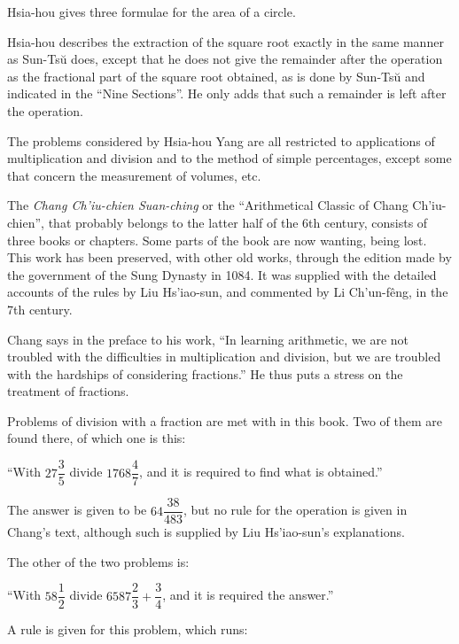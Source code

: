 \documentclass[11pt]{article}
\newcommand{\scanpage}[2]{\clearpage\setcounter{footnote}{0}\noindent{\footnotesize\color{gray}PDF page #1 · #2}\par\medskip}
\newcommand{\scanfooter}{}
\begin{document}
Hsia-hou gives three formulae for the area of a circle.

Hsia-hou describes the extraction of the square root exactly in the same manner as Sun-Tsŭ does, except that he does not give the remainder after the operation as the fractional part of the square root obtained, as is done by Sun-Tsŭ and indicated in the ``Nine Sections''. He only adds that such a remainder is left after the operation.

The problems considered by Hsia-hou Yang are all restricted to applications of multiplication and division and to the method of simple percentages, except some that concern the measurement of volumes, etc.

The \emph{Chang Ch'iu-chien Suan-ching} or the ``Arithmetical Classic of Chang Ch'iu-chien'', that probably belongs to the latter half of the 6th century, consists of three books or chapters. Some parts of the book are now wanting, being lost. This work has been preserved, with other old works, through the edition made by the government of the Sung Dynasty in 1084. It was supplied with the detailed accounts of the rules by Liu Hs'iao-sun, and commented by Li Ch'un-fêng, in the 7th century.

Chang says in the preface to his work, ``In learning arithmetic, we are not troubled with the difficulties in multiplication and division, but we are troubled with the hardships of considering fractions.'' He thus puts a stress on the treatment of fractions.

Problems of division with a fraction are met with in this book. Two of them are found there, of which one is this:

``With $27\dfrac{3}{5}$ divide $1768\dfrac{4}{7}$, and it is required to find what is obtained.''
\scanfooter

\scanpage{0054}{Part I, printed page 40}

The answer is given to be $64\dfrac{38}{483}$, but no rule for the operation is given in Chang's text, although such is supplied by Liu Hs'iao-sun's explanations.

The other of the two problems is:

``With $58\dfrac{1}{2}$ divide $6587\dfrac{2}{3}+\dfrac{3}{4}$, and it is required the answer.''

A rule is given for this problem, which runs:
\end{document}
